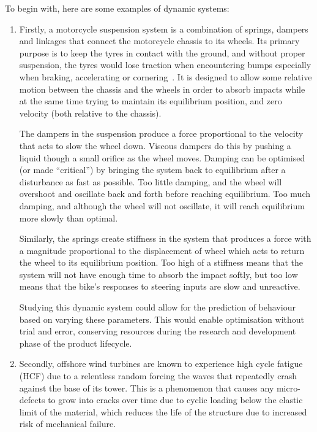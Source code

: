\documentclass[12pt]{article}
\begin{document}
    To begin with, here are some examples of dynamic systems:
    \begin{enumerate}[listparindent=\parindent]
        \item Firstly, a motorcycle suspension system is a combination of springs, dampers and linkages that connect the motorcycle chassis to its wheels.
        Its primary purpose is to keep the tyres in contact with the ground, and without proper suspension, the tyres would lose traction when encountering bumps especially when braking, accelerating or cornering~\cite{UTI2020MotorcycleSuspension}.
        It is designed to allow some relative motion between the chassis and the wheels in order to absorb impacts while at the same time trying to maintain its equilibrium position, and zero velocity (both relative to the chassis).

        The dampers in the suspension produce a force proportional to the velocity that acts to slow the wheel down.
        Viscous dampers do this by pushing a liquid though a small orifice as the wheel moves.
        Damping can be optimised (or made ``critical'') by bringing the system back to equilibrium after a disturbance as fast as possible.
        Too little damping, and the wheel will overshoot and oscillate back and forth before reaching equilibrium.
        Too much damping, and although the wheel will not oscillate, it will reach equilibrium more slowly than optimal.

        Similarly, the springs create stiffness in the system that produces a force with a magnitude proportional to the displacement of wheel which acts to return the wheel to its equilibrium position.
        Too high of a stiffness means that the system will not have enough time to absorb the impact softly, but too low means that the bike's responses to steering inputs are slow and unreactive.

        Studying this dynamic system could allow for the prediction of behaviour based on varying these parameters.
        This would enable optimisation without trial and error, conserving resources during the research and development phase of the product lifecycle.

        \item Secondly, offshore wind turbines are known to experience high cycle fatigue (HCF) due to a relentless random forcing the waves that repeatedly crash against the base of its tower.
        This is a phenomenon that causes any micro-defects to grow into cracks over time due to cyclic loading below the elastic limit of the material, which reduces the life of the structure due to increased risk of mechanical failure.


\end{enumerate}
\end{document}

